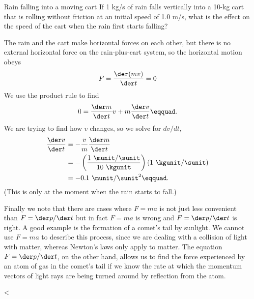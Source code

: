 \begin{eg}{Rain falling into a moving cart}
\egquestion If 1 kg/s of rain falls vertically into a 10-kg
cart that is rolling without friction at an initial speed of
1.0 m/s, what is the effect on the speed of the cart when
the rain first starts falling?

\eganswer The rain and the cart make horizontal forces on
each other, but there is no external horizontal force on the
rain-plus-cart system, so the horizontal motion obeys
\begin{equation*}
        F = \frac{\der(mv)}{\der t}         =  0
\end{equation*}
We use the product rule to find
\begin{equation*}
 0 = \frac{\der m}{\der t}v + m\frac{\der v}{\der t}\eqquad.
\end{equation*}
We are trying to find how $v$ changes, so we solve for $dv/dt$,
\begin{align*}
 \frac{\der v}{\der t}&= -\frac{v}{m}\frac{\der m}{\der t} \\
 &= -\left(\frac{1\ \munit/\sunit}{10\ \kgunit}\right)\left(1\ \kgunit/\sunit\right)\\
 &= -0.1\ \munit/\sunit^2\eqquad.
\end{align*}
(This is only at the moment when the rain starts to fall.)
\end{eg}

Finally we note that there are cases where $F=ma$ is
not just less convenient than $F=\der p/\der t$ but in fact
$F=ma$ is wrong and $F=\der p/\der t$ is right. A good
example is the formation of a comet's tail by sunlight. We
cannot use $F=ma$ to describe this process, since we
are dealing with a collision of light with matter, whereas
Newton's laws only apply to matter. The equation $F=\der p/\der t$,
on the other hand, allows us to find the force experienced
by an atom of gas in the comet's tail if we know the rate at
which the momentum vectors of light rays are being turned
around by reflection from the atom.

<%

